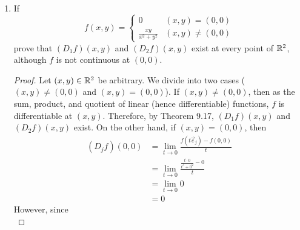\documentclass[../psets.tex]{subfiles}
\begin{document}
\begin{enumerate}[label={\textbf{\arabic*.}}]
\begin{proof}
\begin{align*}
        \end{align*}
        as desired.\par
        We also have by the Cauchy-Schwarz inequality that
        \begin{equation*}
            \norm{A} = \sup_{\substack{\vec{x}\in\R^n\\|\vec{x}|=1}}|A\vec{x}|
            = \sup_{\substack{\vec{x}\in\R^n\\|\vec{x}|=1}}|\vec{x}\cdot\vec{y}|
            \leq \sup_{\substack{\vec{x}\in\R^n\\|\vec{x}|=1}}|\vec{x}|\cdot|\vec{y}|
            = |\vec{y}|
        \end{equation*}
        Moreover, equality holds by noting that if $\vec{x}=\vec{y}/|\vec{y}|$, then
        \begin{equation*}
            |\vec{x}\cdot\vec{y}| = \frac{|\vec{y}|^2}{|\vec{y}|} = |\vec{y}|
        \end{equation*}
        so the leftmost supremum is also at least $|\vec{y}|$, as desired.
    \end{proof}
    \item If
    \begin{equation*}
        f(x,y) =
        \begin{cases}
            0 & (x,y)=(0,0)\\
            \frac{xy}{x^2+y^2} & (x,y)\neq(0,0)
        \end{cases}
    \end{equation*}
    prove that $(D_1f)(x,y)$ and $(D_2f)(x,y)$ exist at every point of $\mathbb{R}^2$, although $f$ is not continuous at $(0,0)$.
    \begin{proof}
        Let $(x,y)\in\mathbb{R}^2$ be arbitrary. We divide into two cases ($(x,y)\neq(0,0)$ and $(x,y)=(0,0)$). If $(x,y)\neq(0,0)$, then as the sum, product, and quotient of linear (hence differentiable) functions, $f$ is differentiable at $(x,y)$. Therefore, by Theorem 9.17, $(D_1f)(x,y)$ and $(D_2f)(x,y)$ exist. On the other hand, if $(x,y)=(0,0)$, then
        \begin{align*}
            (D_jf)(0,0) &= \lim_{t\to 0}\frac{f(t\vec{e}_j)-f(0,0)}{t}\\
            &= \lim_{t\to 0}\frac{\frac{t\cdot 0}{t^2+0^2}-0}{t}\\
            &= \lim_{t\to 0}0\\
            &= 0
        \end{align*}
        However, since
        \begin{equation*}

\end{equation*}
\end{proof}
\end{enumerate}
\end{document}

